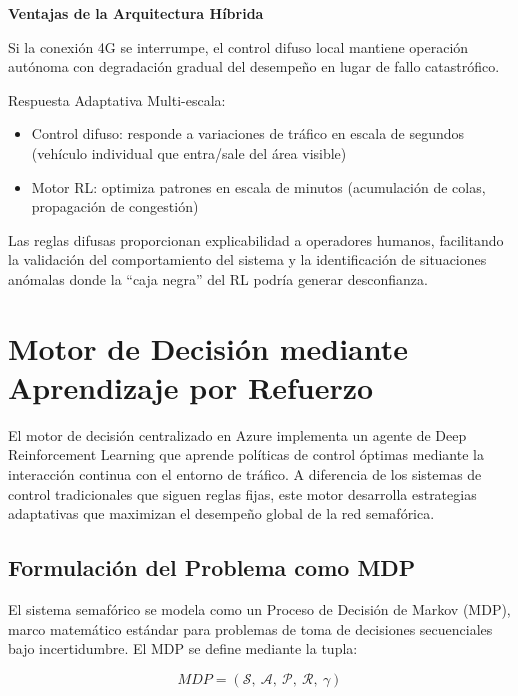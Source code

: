 \documentclass[12pt,a4paper,oneside]{report}
\begin{document}
\textbf{Ventajas de la Arquitectura Híbrida}

Si la conexión 4G se interrumpe, el control difuso local mantiene operación autónoma con degradación gradual del desempeño en lugar de fallo catastrófico.

Respuesta Adaptativa Multi-escala:

\begin{itemize}
\item
  Control difuso: responde a variaciones de tráfico en escala de segundos (vehículo individual que entra/sale del área visible)
\item
  Motor RL: optimiza patrones en escala de minutos (acumulación de colas, propagación de congestión)
\end{itemize}

Las reglas difusas proporcionan explicabilidad a operadores humanos, facilitando la validación del comportamiento del sistema y la identificación de situaciones anómalas donde la ``caja negra'' del RL podría generar desconfianza.

\section{Motor de Decisión mediante Aprendizaje por Refuerzo}\label{motor-de-decisiuxf3n-mediante-aprendizaje-por-refuerzo}

El motor de decisión centralizado en Azure implementa un agente de Deep Reinforcement Learning que aprende políticas de control óptimas mediante la interacción continua con el entorno de tráfico. A diferencia de los sistemas de control tradicionales que siguen reglas fijas, este motor desarrolla estrategias adaptativas que maximizan el desempeño global de la red semafórica.

\subsection{Formulación del Problema como MDP}\label{formulaciuxf3n-del-problema-como-mdp}

El sistema semafórico se modela como un Proceso de Decisión de Markov (MDP), marco matemático estándar para problemas de toma de decisiones secuenciales bajo incertidumbre. El MDP se define mediante la tupla:

\begin{equation}
MDP = (\mathcal{S},\ \mathcal{A},\ \mathcal{P},\ \mathcal{R},\ \gamma)
\label{eq:mdp}
\end{equation}
\end{document}
